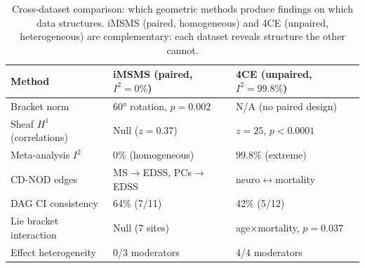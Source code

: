 \begin{table}[t]
\centering
\caption{Cross-dataset comparison: which geometric methods produce findings on which data structures. iMSMS (paired, homogeneous) and 4CE (unpaired, heterogeneous) are complementary: each dataset reveals structure the other cannot.}
\label{tab:cross_dataset}
\begin{tabular}{lll}
\toprule
Method & iMSMS (paired, $I^2=0\%$) & 4CE (unpaired, $I^2=99.8\%$) \\
\midrule
Bracket norm & 60° rotation, $p=0.002$ & N/A (no paired design) \\
Sheaf $H^1$ (correlations) & Null ($z=0.37$) & $z=25$, $p < 0.0001$ \\
Meta-analysis $I^2$ & $0\%$ (homogeneous) & $99.8\%$ (extreme) \\
CD-NOD edges & MS$\to$EDSS, PCs$\to$EDSS & neuro$\leftrightarrow$mortality \\
DAG CI consistency & 64\% (7/11) & 42\% (5/12) \\
Lie bracket interaction & Null (7 sites) & age$\times$mortality, $p=0.037$ \\
Effect heterogeneity & 0/3 moderators & 4/4 moderators \\
\bottomrule
\end{tabular}
\end{table}